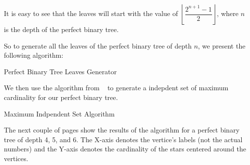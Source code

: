 \documentclass{amsart}
\theoremstyle{definition}
\begin{document}
\begin{appendix}
	It is easy to see that the leaves will start with the value of $\left\lfloor\dfrac{2^{n + 1} - 1}{2}\right\rfloor$, where $n$ is the depth of the perfect binary tree.

	\newpage
	So to generate all the leaves of the perfect binary tree of depth $n$, we present the following algorithm:

	\begin{algorithm}[hbt!]
		\caption{Perfect Binary Tree Leaves Generator}\label{alg:leaves-generator}


	\end{algorithm}

	We then use the algorithm from ~\cite{Niskanen2003CliquerUG} to generate a indepdent set of maximum cardinality for our perfect binary tree.

	\begin{algorithm}[hbt!]
		\caption{Maximum Indpendent Set Algorithm}\label{alg:max-independent-set}


	\end{algorithm}


	The next couple of pages show the results of the algorithm for a perfect binary tree of depth 4, 5, and 6. The X-axis denotes the vertice's labels (not the actual numbers) and the Y-axis denotes the cardinality of the stars centered around the vertices.


\end{appendix}
\end{document}
